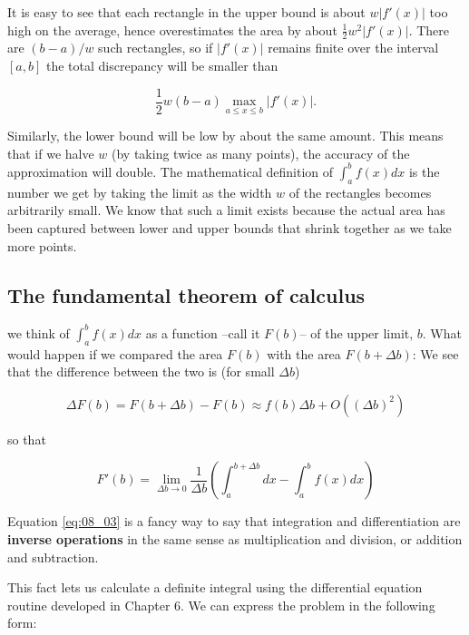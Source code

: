 It is easy to see that each rectangle in the upper bound is about $w\lvert f'(x)\rvert$ too high on the average, hence overestimates the area by about $\frac{1}{2}w^2\lvert f'(x)\rvert$. There are $(b-a)/w$ such rectangles, so if $\lvert f'(x)\rvert$ remains finite over the interval $[a, b]$ the total discrepancy will be smaller than

\begin{equation*}
\frac{1}{2}w(b-a) \max_{a\leq x \leq b} \lvert f'(x)\rvert.
\end{equation*}

Similarly, the lower bound will be low by about the same amount. This means that if we halve $w$ (by taking twice as many points), the accuracy of the approximation will double. The mathematical definition of $\int_{a}^{b} f(x) dx$ is the number we get by taking the limit as the width $w$ of the rectangles becomes arbitrarily small. We know that such a limit exists because the actual area has been captured between lower and upper bounds that shrink together as we take more points.

\subsection{The fundamental theorem of calculus}
 we think of $\int_{a}^{b}f(x) dx$ as a function --call it $F(b)$-- of the upper limit, $b$. What would happen if we compared the area $F(b)$ with the area $F(b + \Delta b)$: We see that the difference between the two is (for small $\Delta b$)

\begin{equation}
\Delta F(b) = F(b+\Delta b) - F(b) \approx f(b)\Delta b + O((\Delta b)^2) 
\end{equation}

so that

\begin{equation}\label{eq:08_03}
F'(b) = \lim_{\Delta b \to 0} \frac{1}{\Delta b} \left(\int_{a}^{b+\Delta b} dx - \int_{a}^{b}f(x) dx \right)
\end{equation}

Equation \ref{eq:08_03} is a fancy way to say that integration and differentiation are \textbf{inverse operations} in the same sense as multiplication and division, or addition and subtraction.

This fact lets us calculate a definite integral using the differential equation routine developed in Chapter 6. We can express the problem in the following form:

